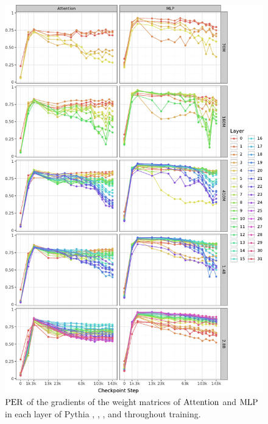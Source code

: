\begin{figure}[h!]
    \centering
    \includegraphics[width=0.9\linewidth]{chapters/tending-towards-stability/figures/per_grad_lines.pdf}
    \vspace{-5pt}
    \caption{$\mathrm{PER}$ of the gradients of the weight matrices of $\mathrm{Attention}$ and $\mathrm{MLP}$ in each layer of Pythia , , ,  and  throughout training.}%
    \label{fig:per_grad-layer-wise-lines}
\end{figure}
\clearpage



